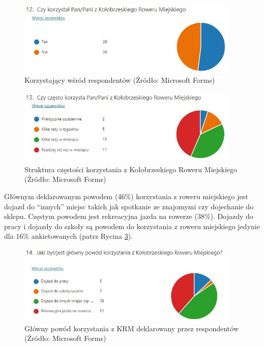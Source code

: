 \documentclass{amuthesis}
\begin{document}
\begin{figure}[t]

{\centering \includegraphics[width=400px]{figures/ankieta/12} 

}

\caption{Korzystający wśród respondentów (Źródło: Microsoft Forms)}\label{fig:ankieta12}
\end{figure}

\begin{figure}[t]

{\centering \includegraphics[width=400px]{figures/ankieta/13} 

}

\caption{Struktura częstości korzystania z Kołobrzeskiego Roweru Miejskiego (Źródło: Microsoft Forms)}\label{fig:ankieta13}
\end{figure}

Głównym deklarowanym powodem (46\%) korzystania z roweru miejskiego jest dojazd do ``innych'' miejsc takich jak spotkanie ze znajomymi czy dojechanie do sklepu.
Częstym powodem jest rekreacyjna jazda na rowerze (38\%).
Dojazdy do pracy i dojazdy do szkoły są powodem do korzystania z roweru miejskiego jedynie dla 16\% ankietowanych (patrz Rycina \ref{fig:ankieta14}).

\begin{figure}[t]

{\centering \includegraphics[width=400px]{figures/ankieta/14} 

}

\caption{Główny powód korzystania z KRM deklarowany przez respondentów (Źródło: Microsoft Forms)}\label{fig:ankieta14}
\end{figure}
\end{document}
